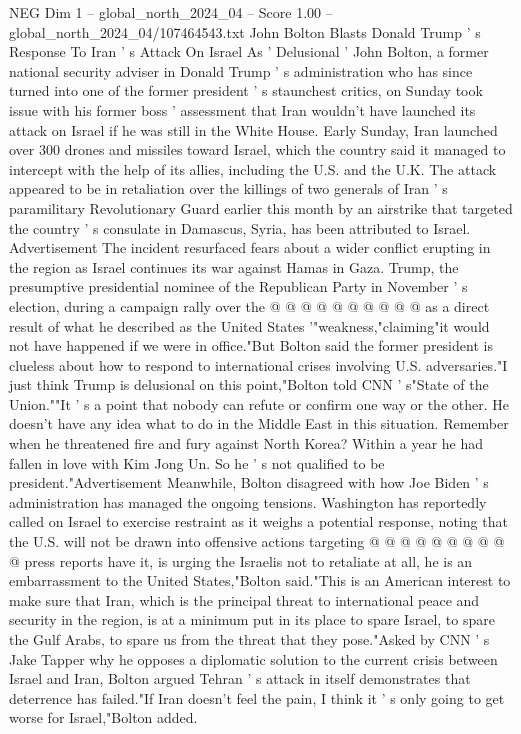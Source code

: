 \begin{textsample}{NEG Dim 1 – global\_north\_2024\_04 – Score 1.00 – global\_north\_2024\_04/107464543.txt}  \label{ex:f1_neg_257}
John Bolton Blasts Donald Trump ' s Response To Iran ' s Attack On Israel As ' Delusional ' John Bolton, a former national security adviser in Donald Trump ' s administration who has since turned into one of the former president ' s staunchest critics, on Sunday took issue with his former boss ' assessment that Iran wouldn't have launched its attack on Israel if he was still in the White House.
Early Sunday, Iran launched over 300 drones and missiles toward Israel, which the country said it managed to intercept with the help of its allies, including the U.S. and the U.K.
The attack appeared to be in retaliation over the killings of two generals of Iran ' s paramilitary Revolutionary Guard earlier this month by an airstrike that targeted the country ' s consulate in Damascus, Syria, has been attributed to Israel.
Advertisement The incident resurfaced fears about a wider conflict erupting in the region as Israel continues its war against Hamas in Gaza.
Trump, the presumptive presidential nominee of the Republican Party in November ' s election, during a campaign rally over the @ @ @ @ @ @ @ @ @ @ as a direct result of what he described as the United States '"weakness,"claiming"it would not have happened if we were in office."But Bolton said the former president is clueless about how to respond to international crises involving U.S. adversaries."I just think Trump is delusional on this point,"Bolton told CNN ' s"State of the Union.""It ' s a point that nobody can refute or confirm one way or the other.
He doesn't have any idea what to do in the Middle East in this situation.
Remember when he threatened fire and fury against North Korea?
Within a year he had fallen in love with Kim Jong Un.
So he ' s not qualified to be president."Advertisement Meanwhile, Bolton disagreed with how Joe Biden ' s administration has managed the ongoing tensions.
Washington has reportedly called on Israel to exercise restraint as it weighs a potential response, noting that the U.S. will not be drawn into offensive actions targeting @ @ @ @ @ @ @ @ @ @ press reports have it, is urging the Israelis not to retaliate at all, he is an embarrassment to the United States,"Bolton said."This is an American interest to make sure that Iran, which is the principal threat to international peace and security in the region, is at a minimum put in its place to spare Israel, to spare the Gulf Arabs, to spare us from the threat that they pose."Asked by CNN ' s Jake Tapper why he opposes a diplomatic solution to the current crisis between Israel and Iran, Bolton argued Tehran ' s attack in itself demonstrates that deterrence has failed."If Iran doesn't feel the pain, I think it ' s only going to get worse for Israel,"Bolton added.

\end{textsample}
